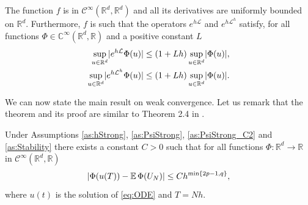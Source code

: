 \documentclass{siamart1116}
\numberwithin{theorem}{section}
\DeclarePairedDelimiter{\abs}{\lvert}{\rvert}
\newcommand{\R}{\mathbb{R}}
\newcommand{\C}{\mathbb{C}}
\newcommand{\diffL}{\mathcal{L}}
\newcommand{\E}{\operatorname{\mathbb{E}}}
\begin{document}
\begin{assumption}\label{as:Stability} The function $f$ is in $\mathcal{C}^\infty(\R^d, \R^d)$ and all its derivatives are uniformly bounded on $\R^d$. Furthermore, $f$ is such that the operators $e^{h\diffL}$ and $e^{h\diffL^h}$ satisfy, for all functions $\Phi\in\C^{\infty}(\R^d, \R)$ and a positive constant $L$
	\begin{equation}
	\begin{aligned}
		\sup_{u\in\R^d} \abs{e^{h\diffL}\Phi(u)} &\leq (1 + Lh)\sup_{u\in\R^d}\abs{\Phi(u)},\\
		\sup_{u\in\R^d} \abs{e^{h\diffL^h}\Phi(u)} &\leq (1 + Lh)\sup_{u\in\R^d}\abs{\Phi(u)}.
	\end{aligned}
	\end{equation}
\end{assumption}

We can now state the main result on weak convergence. Let us remark that the theorem and its proof are similar to Theorem 2.4 in \cite{CGS16}.

\begin{theorem}\label{thm:weakOrder} Under Assumptions \ref{as:hStrong}, \ref{as:PsiStrong}, \ref{as:PsiStrong_C2} and \ref{as:Stability} there exists a constant $C > 0$ such that for all functions $\Phi\colon\R^d\to\R$ in $\mathcal{C}^\infty(\R^d,\R)$
	\begin{equation}
		\abs{\Phi(u(T)) - \E\Phi(U_N)} \leq Ch^{\min\{2p - 1, q\}},
	\end{equation}
	where $u(t)$ is the solution of \eqref{eq:ODE} and $T = Nh$. 
\end{theorem}
\end{document}

